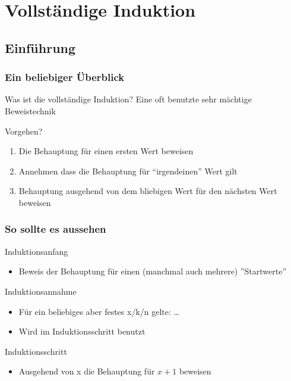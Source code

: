\documentclass{beamer}
\begin{document}
\section{Vollst\"andige Induktion}
\subsection[Einf\"uhrung]{Einf\"uhrung}
	
\begin{frame}
	\frametitle{Ein beliebiger \"Uberblick}
	\begin{block}{Was ist die vollst\"andige Induktion?}
		Eine oft benutzte sehr m\"achtige Beweistechnik
	\end{block}
	\begin{block}{Vorgehen?}
		\begin{enumerate}
  			\item Die Behauptung f\"ur einen ersten Wert beweisen
		 	\item Annehmen dass die Behauptung f\"ur ``irgendeinen'' Wert gilt
  			\item Behauptung ausgehend von dem bliebigen Wert f\"ur den n\"achsten Wert
  			beweisen
		\end{enumerate}
	\end{block}
\end{frame}

\begin{frame}
	\frametitle{So sollte es aussehen}
	\begin{block}{Induktionsanfang}
		\begin{itemize}
 			\item Beweis der Behauptung für einen (manchmal auch mehrere) ''Startwerte''
		\end{itemize}
	\end{block}
	\pause
	\begin{block}{Induktionsannahme}
		\begin{itemize}
  			\item F\"ur ein beliebiges aber festes x/k/n gelte: \ldots
  			\item Wird im Induktionsschritt benutzt
		\end{itemize}
	\end{block}
	\pause
	\begin{block}{Induktionsschritt}
		\begin{itemize}
  			\item Ausgehend von x die Behauptung f\"ur $x + 1$ beweisen
		\end{itemize}
	\end{block}
\end{frame}
\end{document}
